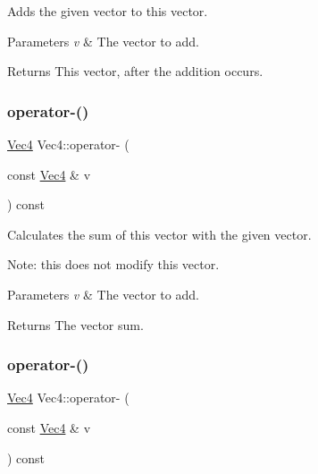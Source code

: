 Adds the given vector to this vector.


\begin{DoxyParams}{Parameters}
{\em v} & The vector to add. \\
\hline
\end{DoxyParams}
\begin{DoxyReturn}{Returns}
This vector, after the addition occurs. 
\end{DoxyReturn}
\mbox{\label{classVec4_a54d8d01faa652f7c3b7204644a01a0d3}} 
\subsubsection{\texorpdfstring{operator-\/()}{operator-()}\hspace{0.1cm}{\footnotesize\ttfamily [1/4]}}
{\footnotesize\ttfamily \hyperlink{classVec4}{Vec4} Vec4\+::operator-\/ (\begin{DoxyParamCaption}\item[{const \hyperlink{classVec4}{Vec4} \&}]{v }\end{DoxyParamCaption}) const\hspace{0.3cm}{\ttfamily [inline]}}

Calculates the sum of this vector with the given vector.

Note\+: this does not modify this vector.


\begin{DoxyParams}{Parameters}
{\em v} & The vector to add. \\
\hline
\end{DoxyParams}
\begin{DoxyReturn}{Returns}
The vector sum. 
\end{DoxyReturn}
\mbox{\label{classVec4_a54d8d01faa652f7c3b7204644a01a0d3}} 
\subsubsection{\texorpdfstring{operator-\/()}{operator-()}\hspace{0.1cm}{\footnotesize\ttfamily [2/4]}}
{\footnotesize\ttfamily \hyperlink{classVec4}{Vec4} Vec4\+::operator-\/ (\begin{DoxyParamCaption}\item[{const \hyperlink{classVec4}{Vec4} \&}]{v }\end{DoxyParamCaption}) const\hspace{0.3cm}{\ttfamily [inline]}}

